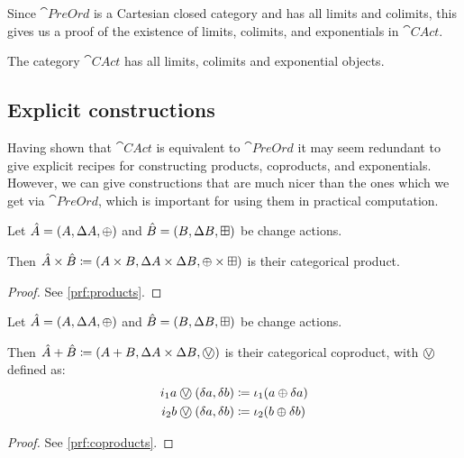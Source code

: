 Since $\cat{PreOrd}$ is a Cartesian closed category and has all limits and
colimits, this gives us a proof of the existence of limits, colimits, and exponentials in $\cat{CAct}$.

\begin{corollary}
  The category $\cat{CAct}$ has all limits, colimits and exponential objects.
\end{corollary}

\subsection{Explicit constructions}

Having shown that $\cat{CAct}$ is equivalent to $\cat{PreOrd}$ it may seem
redundant to give explicit recipes for constructing products, coproducts, and exponentials.
However, we can give constructions that are much nicer than the ones
which we get via $\cat{PreOrd}$, which is important for using them in
practical computation.

\begin{prop}[name=Products, restate=products]
  \label{prop:products}
  Let $\hat{A} = (A,\Delta A,\oplus)$ and $\hat{B} =
  (B,\Delta B,\boxplus)$ be change actions.

  Then $\hat{A} \times \hat{B} \coloneqq (A \times B,\Delta A \times
  \Delta B,\oplus \times \boxplus)$ is their categorical product.
\end{prop}
\ifproofs
\begin{proof}
  See \cref{prf:products}.
\end{proof}
\fi

\begin{prop}[name=Coproducts, restate=coproducts]
  \label{prop:coproducts}
  Let $\hat{A} = (A,\Delta A,\oplus)$ and $\hat{B} =
  (B,\Delta B,\boxplus)$ be change actions.

  Then $\cstr{A} + \cstr{B} \defeq \cstruct{A + B}{\changes{A} \times
  \changes{B}}{\cplusvee}$ is their categorical coproduct, with $\cplusvee$ defined as:
  \begin{align*}
    i_1 a \cplusvee (\change{a}, \change{b}) &\defeq \iota_1 (a \cplus \change{a})\\
    i_2 b \cplusvee (\change{a}, \change{b}) &\defeq \iota_2 (b \cplus \change{b})
  \end{align*}
\end{prop}
\ifproofs
\begin{proof}
  See \cref{prf:coproducts}.
\end{proof}
\fi

